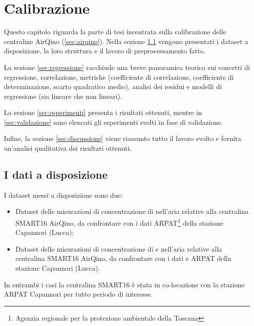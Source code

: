 \chapter{Calibrazione}\label{ch:calibrazione}
Questo capitolo riguarda la parte di tesi incentrata sulla calibrazione delle centraline AirQino (\ref{sec:airqino}). Nella sezione \ref{sec:dati} vengono presentati i dataset a disposizione, la loro struttura e il lavoro di preprocessamento fatto.

La sezione \ref{sec:regressione} racchiude una breve panoramica teorica sui concetti di regressione, correlazione, metriche (coefficiente di correlazione, coefficiente di determinazione, scarto quadratico medio), analisi dei residui e modelli di regressione (sia lineare che non lineari).

La sezione \ref{sec:esperimenti} presenta i risultati ottenuti, mentre in \ref{sec:validazione} sono elencati gli esperimenti svolti in fase di validazione.

Infine, la sezione \ref{sec:discussione} viene riassunto tutto il lavoro svolto e fornita un'analisi qualitativa dei risultati ottenuti.

\clearpage
\section{I dati a disposizione}\label{sec:dati}
I dataset messi a disposizione sono due:

\begin{itemize}
  \item Dataset delle misurazioni di concentrazione di  nell'aria relative alla centralina SMART16 AirQino, da confrontare con i dati  ARPAT\footnote{Agenzia regionale per la protezione ambientale della Toscana} della stazione Capannori (Lucca);
  \item Dataset delle misurazioni di concentrazione di  e  nell'aria relative alla centralina SMART16 AirQino, da confrontare con i dati  e  ARPAT della stazione Capannori (Lucca).
\end{itemize}

In entrambi i casi la centralina SMART16 è stata in co-locazione con la stazione ARPAT Capannori per tutto periodo di interesse.\\

